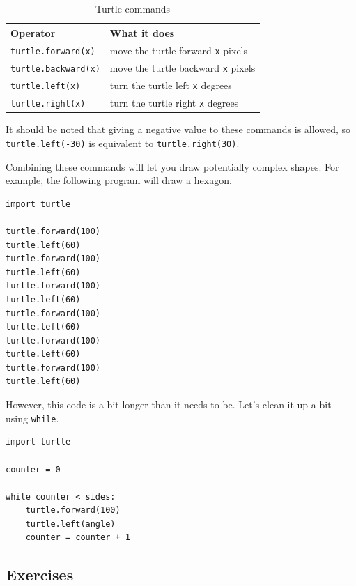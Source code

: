 \documentclass[11pt]{cselabheader}
\begin{document}
\begin{table}[h]
  \centering
  \begin{tabular}{ll}
    \toprule
    Operator & What it does\\
    \midrule
    \lstinline!turtle.forward(x)! & move the turtle forward \lstinline!x! pixels \\
    \lstinline!turtle.backward(x)! & move the turtle backward \lstinline!x! pixels \\
    \lstinline!turtle.left(x)! & turn the turtle left \lstinline!x! degrees \\
    \lstinline!turtle.right(x)! & turn the turtle right \lstinline!x! degrees \\
    \bottomrule
  \end{tabular}
  \caption{Turtle commands}
  \label{tab:turtle}
\end{table}

It should be noted that giving a negative value to these commands is allowed, so
\lstinline!turtle.left(-30)! is equivalent to \lstinline!turtle.right(30)!.

Combining these commands will let you draw potentially complex shapes. For
example, the following program will draw a hexagon.

\begin{lstlisting}[style=python]
import turtle

turtle.forward(100)
turtle.left(60)
turtle.forward(100)
turtle.left(60)
turtle.forward(100)
turtle.left(60)
turtle.forward(100)
turtle.left(60)
turtle.forward(100)
turtle.left(60)
turtle.forward(100)
turtle.left(60)
\end{lstlisting}

However, this code is a bit longer than it needs to be. Let's clean it up a bit using \lstinline{while}.

\begin{lstlisting}[style=python]
import turtle

counter = 0

while counter < sides:
    turtle.forward(100)
    turtle.left(angle)
    counter = counter + 1
\end{lstlisting}

\pagebreak
\subsection{Exercises}
\label{subsec:turtleex}
\end{document}
